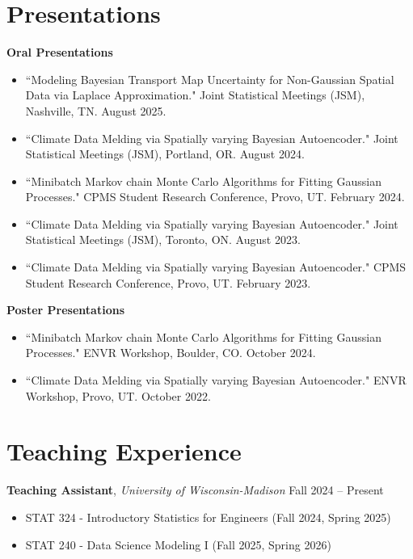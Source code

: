 \documentclass[11pt, letterpaper]{article}
\begin{document}
\section{Presentations}
\textbf{Oral Presentations}
\begin{itemize}
	\item ``Modeling Bayesian Transport Map Uncertainty for Non-Gaussian Spatial Data via Laplace Approximation." Joint Statistical Meetings (JSM), Nashville, TN. August 2025.
	\item ``Climate Data Melding via Spatially varying Bayesian Autoencoder." Joint Statistical Meetings (JSM), Portland, OR. August 2024.
	\item ``Minibatch Markov chain Monte Carlo Algorithms for Fitting Gaussian Processes." CPMS Student Research Conference, Provo, UT. February 2024.
    \item ``Climate Data Melding via Spatially varying Bayesian Autoencoder." Joint Statistical Meetings (JSM), Toronto, ON. August 2023.
    \item ``Climate Data Melding via Spatially varying Bayesian Autoencoder." CPMS Student Research Conference, Provo, UT. February 2023.
\end{itemize}

\vspace{4pt}
\textbf{Poster Presentations}
\begin{itemize}
	 \item ``Minibatch Markov chain Monte Carlo Algorithms for Fitting Gaussian Processes." ENVR Workshop, Boulder, CO. October 2024.
    \item ``Climate Data Melding via Spatially varying Bayesian Autoencoder." ENVR Workshop, Provo, UT. October 2022.
\end{itemize}


\section{Teaching Experience}
\textbf{Teaching Assistant}, \textit{University of Wisconsin-Madison} \hfill Fall 2024 -- Present
\begin{itemize}
    \item STAT 324 - Introductory Statistics for Engineers (Fall 2024, Spring 2025)
    \item STAT 240 - Data Science Modeling I (Fall 2025, Spring 2026)
\end{itemize}
\end{document}
